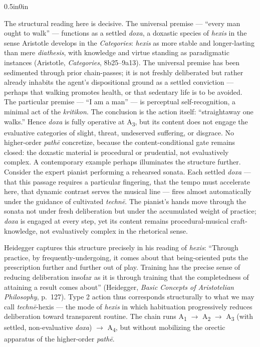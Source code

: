\documentclass{article}
\begin{document}
\begin{adjustwidth}{0.5in}{0in}
\end{adjustwidth} The structural reading here is decisive. The universal premise --- ``every man ought to walk'' --- functions as a settled \textit{doxa}, a doxastic species of \textit{hexis} in the sense Aristotle develops in the \textit{Categories}: \textit{hexis} as more stable and longer-lasting than mere \textit{diathesis}, with knowledge and virtue standing as paradigmatic instances (Aristotle, \textit{Categories}, 8b25--9a13). The universal premise has been sedimented through prior chain-passes; it is not freshly deliberated but rather already inhabits the agent's dispositional ground as a settled conviction --- perhaps that walking promotes health, or that sedentary life is to be avoided. The particular premise --- ``I am a man'' --- is perceptual self-recognition, a minimal act of the \textit{kritikon}. The conclusion is the action itself: ``straightaway one walks.'' Hence \textit{doxa} is fully operative at A\textsubscript{3}, but its content does not engage the evaluative categories of slight, threat, undeserved suffering, or disgrace. No higher-order \textit{path\=e} concretize, because the content-conditional gate remains closed: the doxastic material is procedural or prudential, not evaluatively complex. A contemporary example perhaps illuminates the structure further. Consider the expert pianist performing a rehearsed sonata. Each settled \textit{doxa} --- that this passage requires a particular fingering, that the tempo must accelerate here, that dynamic contrast serves the musical line --- fires almost automatically under the guidance of cultivated \textit{techn\=e}. The pianist's hands move through the sonata not under fresh deliberation but under the accumulated weight of practice; \textit{doxa} is engaged at every step, yet its content remains procedural-musical craft-knowledge, not evaluatively complex in the rhetorical sense. 

Heidegger captures this structure precisely in his reading of \textit{hexis}: ``Through practice, by frequently-undergoing, it comes about that being-oriented puts the prescription further and further out of play. Training has the precise sense of reducing deliberation insofar as it is through training that the completedness of attaining a result comes about'' (Heidegger, \textit{Basic Concepts of Aristotelian Philosophy}, p.~127). Type 2 action thus corresponds structurally to what we may call \textit{techn\=e}-hexis --- the mode of \textit{hexis} in which habituation progressively reduces deliberation toward transparent routine. The chain runs A\textsubscript{1} $\rightarrow$ A\textsubscript{2} $\rightarrow$ A\textsubscript{3} (with settled, non-evaluative \textit{doxa}) $\rightarrow$ A\textsubscript{4}, but without mobilizing the orectic apparatus of the higher-order \textit{path\=e}. 
\end{document}

